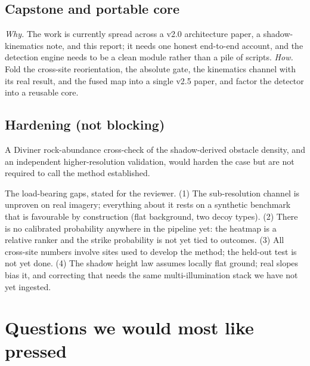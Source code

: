 \documentclass[11pt]{article}
\begin{document}
\subsection{Capstone and portable core}
\emph{Why.} The work is currently spread across a v2.0 architecture paper, a shadow-kinematics
note, and this report; it needs one honest end-to-end account, and the detection engine needs to
be a clean module rather than a pile of scripts. \emph{How.} Fold the cross-site reorientation,
the absolute gate, the kinematics channel with its real result, and the fused map into a single
v2.5 paper, and factor the detector into a reusable core.

\subsection{Hardening (not blocking)}
A Diviner rock-abundance cross-check of the shadow-derived obstacle density, and an independent
higher-resolution validation, would harden the case but are not required to call the method
established.

\begin{limitbox}
The load-bearing gaps, stated for the reviewer. (1) The sub-resolution channel is unproven on
real imagery; everything about it rests on a synthetic benchmark that is favourable by
construction (flat background, two decoy types). (2) There is no calibrated probability anywhere
in the pipeline yet: the heatmap is a relative ranker and the strike probability is not yet
tied to outcomes. (3) All cross-site numbers involve sites used to develop the method; the
held-out test is not yet done. (4) The shadow height law assumes locally flat ground; real
slopes bias it, and correcting that needs the same multi-illumination stack we have not yet
ingested.
\end{limitbox}

\section{Questions we would most like pressed}
\end{document}
